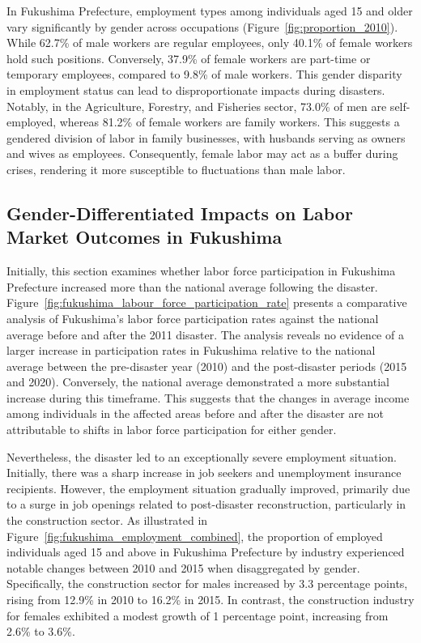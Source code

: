 \documentclass[a4paper,12pt]{article}
\begin{document}
In Fukushima Prefecture, employment types among individuals aged 15 and older vary significantly by gender across occupations (Figure~\ref{fig:proportion_2010}). While 62.7\% of male workers are regular employees, only 40.1\% of female workers hold such positions. Conversely, 37.9\% of female workers are part-time or temporary employees, compared to 9.8\% of male workers. This gender disparity in employment status can lead to disproportionate impacts during disasters. Notably, in the Agriculture, Forestry, and Fisheries sector, 73.0\% of men are self-employed, whereas 81.2\% of female workers are family workers. This suggests a gendered division of labor in family businesses, with husbands serving as owners and wives as employees. Consequently, female labor may act as a buffer during crises, rendering it more susceptible to fluctuations than male labor.






\subsection{Gender-Differentiated Impacts on Labor Market Outcomes in Fukushima}

Initially, this section examines whether labor force participation in Fukushima Prefecture increased more than the national average following the disaster. Figure~\ref{fig:fukushima_labour_force_participation_rate} presents a comparative analysis of Fukushima's labor force participation rates against the national average before and after the 2011 disaster. The analysis reveals no evidence of a larger increase in participation rates in Fukushima relative to the national average between the pre-disaster year (2010) and the post-disaster periods (2015 and 2020). Conversely, the national average demonstrated a more substantial increase during this timeframe. This suggests that the changes in average income among individuals in the affected areas before and after the disaster are not attributable to shifts in labor force participation for either gender.

Nevertheless, the disaster led to an exceptionally severe employment situation. Initially, there was a sharp increase in job seekers and unemployment insurance recipients. However, the employment situation gradually improved, primarily due to a surge in job openings related to post-disaster reconstruction, particularly in the construction sector. As illustrated in Figure~\ref{fig:fukushima_employment_combined}, the proportion of employed individuals aged 15 and above in Fukushima Prefecture by industry experienced notable changes between 2010 and 2015 when disaggregated by gender. Specifically, the construction sector for males increased by 3.3 percentage points, rising from 12.9\% in 2010 to 16.2\% in 2015. In contrast, the construction industry for females exhibited a modest growth of 1 percentage point, increasing from 2.6\% to 3.6\%.
\end{document}
